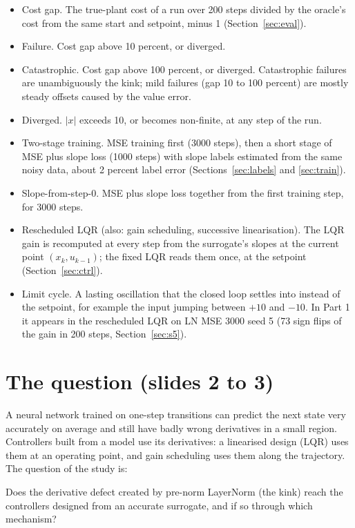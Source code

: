 \documentclass[11pt]{article}
\begin{document}
\begin{itemize}
\item Cost gap. The true-plant cost of a run over 200 steps divided by the oracle's cost from the same start and setpoint, minus 1 (Section~\ref{sec:eval}).
\item Failure. Cost gap above 10 percent, or diverged.
\item Catastrophic. Cost gap above 100 percent, or diverged. Catastrophic failures are unambiguously the kink; mild failures (gap 10 to 100 percent) are mostly steady offsets caused by the value error.
\item Diverged. $|x|$ exceeds 10, or becomes non-finite, at any step of the run.
\item Two-stage training. MSE training first (3000 steps), then a short stage of MSE plus slope loss (1000 steps) with slope labels estimated from the same noisy data, about 2 percent label error (Sections~\ref{sec:labels} and \ref{sec:train}).
\item Slope-from-step-0. MSE plus slope loss together from the first training step, for 3000 steps.
\item Rescheduled LQR (also: gain scheduling, successive linearisation). The LQR gain is recomputed at every step from the surrogate's slopes at the current point $(x_k,u_{k-1})$; the fixed LQR reads them once, at the setpoint (Section~\ref{sec:ctrl}).
\item Limit cycle. A lasting oscillation that the closed loop settles into instead of the setpoint, for example the input jumping between $+10$ and $-10$. In Part 1 it appears in the rescheduled LQR on LN MSE 3000 seed 5 (73 sign flips of the gain in 200 steps, Section~\ref{sec:s5}).
\end{itemize}

\section{The question (slides 2 to 3)}\label{sec:question}

A neural network trained on one-step transitions can predict the next state very accurately on average and still have badly wrong derivatives in a small region. Controllers built from a model use its derivatives: a linearised design (LQR) uses them at an operating point, and gain scheduling uses them along the trajectory. The question of the study is:

Does the derivative defect created by pre-norm LayerNorm (the kink) reach the controllers designed from an accurate surrogate, and if so through which mechanism?
\end{document}
